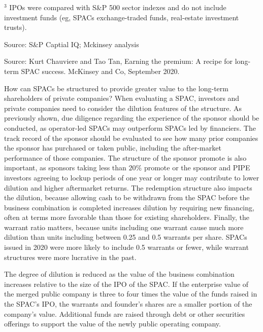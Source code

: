\documentclass[11pt]{article}
\begin{document}
${ }^{3}$ IPOs were compared with S\&P 500 sector indexes and do not include investment funds (eg, SPACs exchange-traded funds, real-estate investment trusts).

Source: S\&P Captial IQ; Mckinsey analysis

Source: Kurt Chauviere and Tao Tan, Earning the premium: A recipe for long-term SPAC success. McKinsey and Co, September 2020.

How can SPACs be structured to provide greater value to the long-term shareholders of private companies? When evaluating a SPAC, investors and private companies need to consider the dilution features of the structure. As previously shown, due diligence regarding the experience of the sponsor should be conducted, as operator-led SPACs may outperform SPACs led by financiers. The track record of the sponsor should be evaluated to see how many prior companies the sponsor has purchased or taken public, including the after-market performance of those companies. The structure of the sponsor promote is also important, as sponsors taking less than $20 \%$ promote or the sponsor and PIPE investors agreeing to lockup periods of one year or longer may contribute to lower dilution and higher aftermarket returns. The redemption structure also impacts the dilution, because allowing cash to be withdrawn from the SPAC before the business combination is completed increases dilution by requiring new financing, often at terms more favorable than those for existing shareholders. Finally, the warrant ratio matters, because units including one warrant cause much more dilution than units including between 0.25 and 0.5 warrants per share. SPACs issued in 2020 were more likely to include 0.5 warrants or fewer, while warrant structures were more lucrative in the past.

The degree of dilution is reduced as the value of the business combination increases relative to the size of the IPO of the SPAC. If the enterprise value of the merged public company is three to four times the value of the funds raised in the SPAC's IPO, the warrants and founder's shares are a smaller portion of the company's value. Additional funds are raised through debt or other securities offerings to support the value of the newly public operating company.
\end{document}
